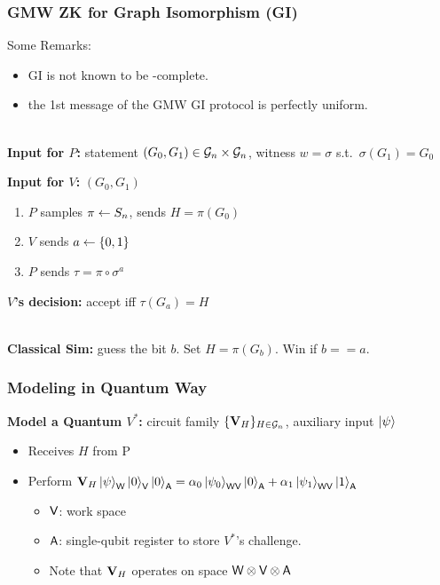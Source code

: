 \documentclass[aspectratio=1610, 12pt, xcolor={dvipsnames}]{beamer}
\begin{document}
\begin{frame}
        \frametitle{GMW ZK for Graph Isomorphism (GI)}

Some Remarks:
\begin{itemize}
\item
GI is not known to be \NP-complete.
\item
the 1st message of the GMW GI protocol is perfectly uniform.
\end{itemize}
~\\

{\bf Input for $P$:} statement $(G_0, G_1) \in \mathcal{G}_n \times\mathcal{G}_n$, witness $w = \sigma$ s.t.\ $\sigma(G_1) = G_0$

{\bf Input for $V$:}  $(G_0, G_1)$
\begin{enumerate}
\item 
$P$ samples $\pi \leftarrow S_n$, sends $H = \pi(G_0)$
\item
$V$ sends $a \leftarrow \{0,1\}$
\item
$P$ sends $\tau = \pi \circ \sigma^a$
\end{enumerate}
{\bf $V$'s decision:} accept iff $\tau(G_a) = H$
\\~

{\bf Classical Sim:} guess the bit $b$. Set $H = \pi(G_b)$. Win if $b == a$.

\end{frame}



\begin{frame}
        \frametitle{Modeling in Quantum Way}


{\bf Model a Quantum $V^*$:} circuit family $\{\vb{V}_H\}_{ H \in \mathcal{G}_n}$, auxiliary input $\ket{\psi}$
\begin{itemize}
	\item Receives $H$ from P
	\item
	Perform $\vb{V}_H \ket{\psi}_\reg{w} \ket{0}_\reg{v} \ket{0}_\reg{a} = \alpha_0 \ket{\psi_0}_\reg{wv} \ket{0}_\reg{a} + \alpha_1 \ket{\psi_1}_\reg{wv} \ket{1}_\reg{a}$ 
	\begin{itemize}
	\item $\reg{v}$: work space
	\item $\reg{a}$: single-qubit register to store $V^*$'s challenge.
	\item Note that $\vb{V}_H$ operates on space $\reg{w}\tensor \reg{v} \tensor \reg{a}$
	\end{itemize}
	
\end{itemize}
\end{frame}
\end{document}
